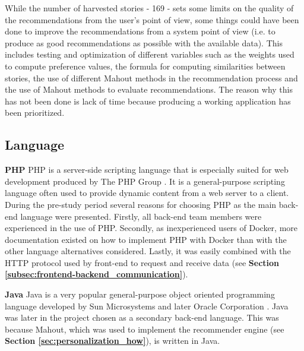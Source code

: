 While the number of harvested stories - 169 - sets some limits on the quality of the recommendations from the user's point of view, some things could have been done to improve the recommendations from a system point of view (i.e. to produce as good recommendations as possible with the available data). This includes testing and optimization of different variables such as the weights used to compute preference values, the formula for computing similarities between stories, the use of different Mahout methods in the recommendation process and the use of Mahout methods to evaluate recommendations. The reason why this has not been done is lack of time because producing a working application has been prioritized. 

\subsection{Language}
\label{subsec:backend_language}
\textbf{PHP}\newline
PHP is a server-side scripting language that is especially suited for web development produced by The PHP Group \cite{HM8}. It is a general-purpose scripting language often used to provide dynamic content from a web server to a client. During the pre-study period several reasons for choosing PHP as the main back-end language were presented. Firstly, all back-end team members were experienced in the use of PHP. Secondly, as inexperienced users of Docker, more documentation existed on how to implement PHP with Docker than with the other language alternatives considered.  Lastly, it was easily combined with the HTTP protocol used by front-end to request and receive data (see \textbf{Section \ref{subsec:frontend-backend_communication}}).\newline

\noindent\textbf{Java}\newline
Java is a very popular general-purpose object oriented programming language developed by Sun Microsystems and later Oracle Corporation \cite{HM9}. Java was later in the project chosen as a secondary back-end language. This was because Mahout, which was used to implement the recommender engine (see \textbf{Section \ref{sec:personalization_how}}), is written in Java. 

\cleardoublepage
